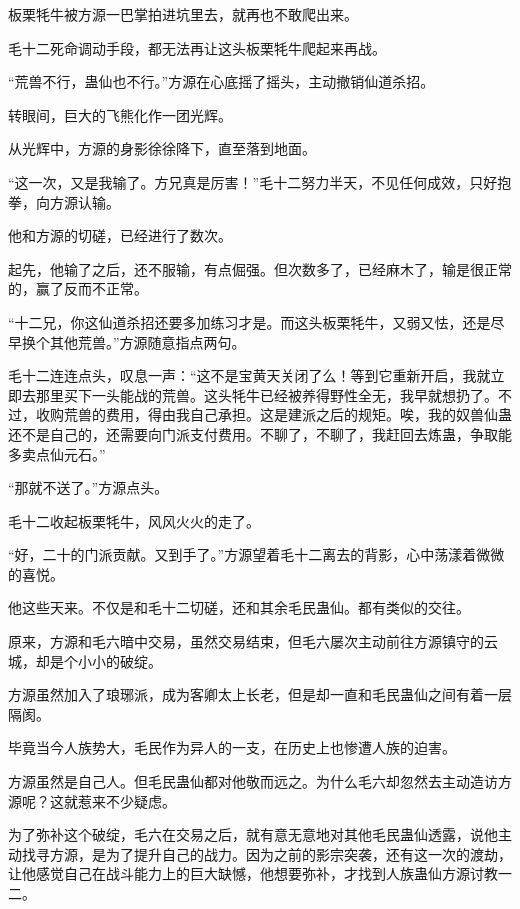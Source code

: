 
\begin{this_body}



板栗牦牛被方源一巴掌拍进坑里去，就再也不敢爬出来。

毛十二死命调动手段，都无法再让这头板栗牦牛爬起来再战。

“荒兽不行，蛊仙也不行。”方源在心底摇了摇头，主动撤销仙道杀招。

转眼间，巨大的飞熊化作一团光辉。

从光辉中，方源的身影徐徐降下，直至落到地面。

“这一次，又是我输了。方兄真是厉害！”毛十二努力半天，不见任何成效，只好抱拳，向方源认输。

他和方源的切磋，已经进行了数次。

起先，他输了之后，还不服输，有点倔强。但次数多了，已经麻木了，输是很正常的，赢了反而不正常。

“十二兄，你这仙道杀招还要多加练习才是。而这头板栗牦牛，又弱又怯，还是尽早换个其他荒兽。”方源随意指点两句。

毛十二连连点头，叹息一声：“这不是宝黄天关闭了么！等到它重新开启，我就立即去那里买下一头能战的荒兽。这头牦牛已经被养得野性全无，我早就想扔了。不过，收购荒兽的费用，得由我自己承担。这是建派之后的规矩。唉，我的奴兽仙蛊还不是自己的，还需要向门派支付费用。不聊了，不聊了，我赶回去炼蛊，争取能多卖点仙元石。”

“那就不送了。”方源点头。

毛十二收起板栗牦牛，风风火火的走了。

“好，二十的门派贡献。又到手了。”方源望着毛十二离去的背影，心中荡漾着微微的喜悦。

他这些天来。不仅是和毛十二切磋，还和其余毛民蛊仙。都有类似的交往。

原来，方源和毛六暗中交易，虽然交易结束，但毛六屡次主动前往方源镇守的云城，却是个小小的破绽。

方源虽然加入了琅琊派，成为客卿太上长老，但是却一直和毛民蛊仙之间有着一层隔阂。

毕竟当今人族势大，毛民作为异人的一支，在历史上也惨遭人族的迫害。

方源虽然是自己人。但毛民蛊仙都对他敬而远之。为什么毛六却忽然去主动造访方源呢？这就惹来不少疑虑。

为了弥补这个破绽，毛六在交易之后，就有意无意地对其他毛民蛊仙透露，说他主动找寻方源，是为了提升自己的战力。因为之前的影宗突袭，还有这一次的渡劫，让他感觉自己在战斗能力上的巨大缺憾，他想要弥补，才找到人族蛊仙方源讨教一二。


\end{this_body}
